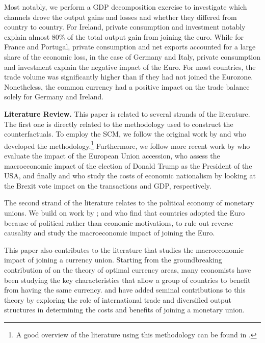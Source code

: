 \documentclass[12pt]{article}
\begin{document}
Most notably, we perform a GDP decomposition exercise to investigate which channels drove the output gains and losses and whether they differed from country to country. For Ireland, private consumption and investment notably explain almost 80\% of the total output gain from joining the euro. While for France and Portugal, private consumption and net exports accounted for a large share of the economic loss, in the case of Germany and Italy, private consumption and investment explain the negative impact of the Euro. For most countries, the trade volume was significantly higher than if they had not joined the Eurozone. Nonetheless, the common currency had a positive impact on the trade balance solely for Germany and Ireland.

\textbf{Literature Review.} This paper is related to several strands of the literature. The first one is directly related to the methodology used to construct the counterfactuals. To employ the SCM, we follow the original work by \cite{Abadie2003} and  \cite{Abadie2010, Abadie2015} who developed the methodology.\footnote{A good overview of the literature using this methodology can be found in \cite{Abadie2019}.} Furthermore, we follow more recent work by \cite{Campos2018} who evaluate the impact of the European Union accession, \cite{Born2019} who assess the macroeconomic impact of the election of Donald Trump as the President of the USA, and finally \cite{Breinlich2020} and \cite{Born2018} who study the costs of economic nationalism by looking at the Brexit vote impact on the transactions and GDP, respectively.

The second strand of the literature relates to the political economy of monetary unions. We build on work by \cite{Eichengreen1993,  Feldstein1997, Dyson1999, Willett2000, James2012}; and  \cite{Spolaore2013} who find that countries adopted the Euro because of political rather than economic motivations, to rule out reverse causality and study the macroeconomic impact of joining the Euro.

This paper also contributes to the literature that studies the macroeconomic impact of joining a currency union. Starting from the groundbreaking contribution of \cite{Mundell1961} on the theory of optimal currency areas, many economists have been studying the key characteristics that allow a group of countries to benefit from having the same currency. \cite{McKinnon1963} and \cite{Kenen1969} have added seminal contributions to this theory by exploring the role of international trade and diversified output structures in determining the costs and benefits of joining a monetary union.
\end{document}

